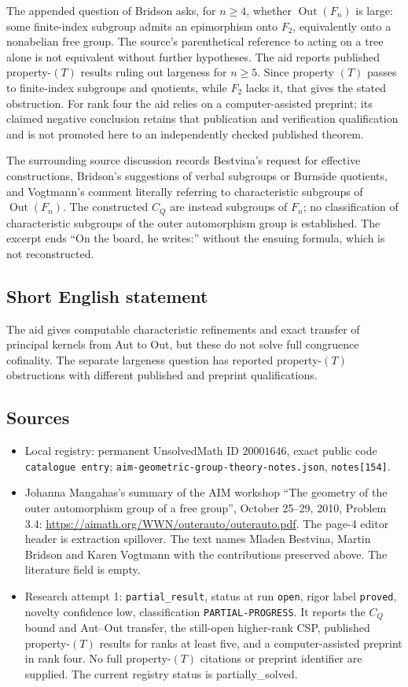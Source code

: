 \documentclass[11pt]{article}
\begin{document}
The appended question of Bridson asks, for \(n\geq4\), whether \(\operatorname{Out}(F_n)\) is large: some finite-index subgroup admits an epimorphism onto \(F_2\), equivalently onto a nonabelian free group. The source's parenthetical reference to acting on a tree alone is not equivalent without further hypotheses. The aid reports published property-\((T)\) results ruling out largeness for \(n\geq5\). Since property \((T)\) passes to finite-index subgroups and quotients, while \(F_2\) lacks it, that gives the stated obstruction. For rank four the aid relies on a computer-assisted preprint; its claimed negative conclusion retains that publication and verification qualification and is not promoted here to an independently checked published theorem.

The surrounding source discussion records Bestvina's request for effective constructions, Bridson's suggestions of verbal subgroups or Burnside quotients, and Vogtmann's comment literally referring to characteristic subgroups of \(\operatorname{Out}(F_n)\). The constructed \(C_Q\) are instead subgroups of \(F_n\); no classification of characteristic subgroups of the outer automorphism group is established. The excerpt ends ``On the board, he writes:'' without the ensuing formula, which is not reconstructed.
\subsection{Short English statement}
The aid gives computable characteristic refinements and exact transfer of principal kernels from Aut to Out, but these do not solve full congruence cofinality. The separate largeness question has reported property-\((T)\) obstructions with different published and preprint qualifications.
\subsection{Sources}
\begin{itemize}
\item Local registry: permanent UnsolvedMath ID \(20001646\), exact public code \texttt{catalogue entry}; \texttt{aim-geometric-group-theory-notes.json}, \texttt{notes[154]}.
\item Johanna Mangahas's summary of the AIM workshop ``The geometry of the outer automorphism group of a free group'', October 25--29, 2010, Problem 3.4: \url{https://aimath.org/WWN/outerauto/outerauto.pdf}. The page-4 editor header is extraction spillover. The text names Mladen Bestvina, Martin Bridson and Karen Vogtmann with the contributions preserved above. The literature field is empty.
\item Research attempt 1: \texttt{partial\_result}, status at run \texttt{open}, rigor label \texttt{proved}, novelty confidence low, classification \texttt{PARTIAL-PROGRESS}. It reports the \(C_Q\) bound and Aut--Out transfer, the still-open higher-rank CSP, published property-\((T)\) results for ranks at least five, and a computer-assisted preprint in rank four. No full property-\((T)\) citations or preprint identifier are supplied. The current registry status is partially_solved.
\end{itemize}
\end{document}
